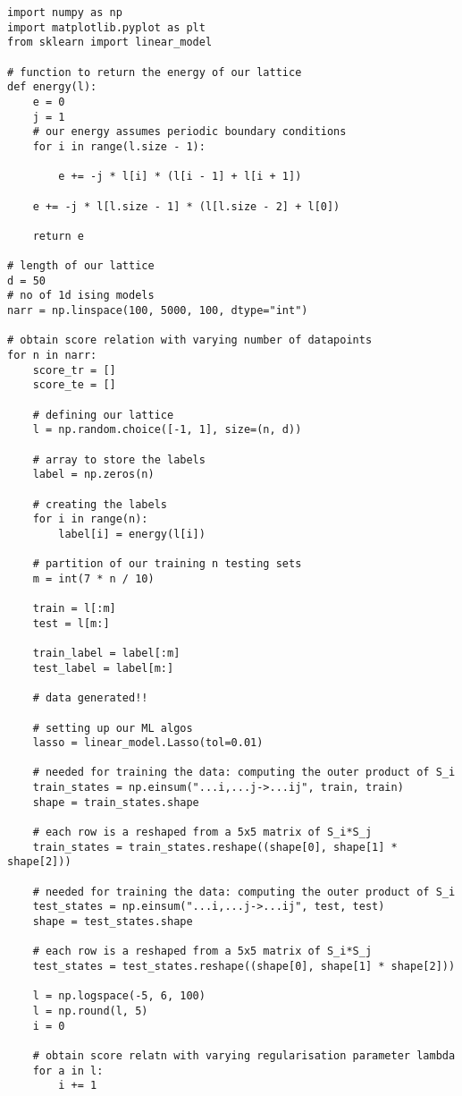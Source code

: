 \begin{verbatim}
import numpy as np
import matplotlib.pyplot as plt
from sklearn import linear_model

# function to return the energy of our lattice
def energy(l):
    e = 0
    j = 1
    # our energy assumes periodic boundary conditions
    for i in range(l.size - 1):

        e += -j * l[i] * (l[i - 1] + l[i + 1])

    e += -j * l[l.size - 1] * (l[l.size - 2] + l[0])

    return e

# length of our lattice
d = 50
# no of 1d ising models
narr = np.linspace(100, 5000, 100, dtype="int")

# obtain score relation with varying number of datapoints
for n in narr:
    score_tr = []
    score_te = []

    # defining our lattice
    l = np.random.choice([-1, 1], size=(n, d))

    # array to store the labels
    label = np.zeros(n)

    # creating the labels
    for i in range(n):
        label[i] = energy(l[i])

    # partition of our training n testing sets
    m = int(7 * n / 10)

    train = l[:m]
    test = l[m:]

    train_label = label[:m]
    test_label = label[m:]

    # data generated!!

    # setting up our ML algos
    lasso = linear_model.Lasso(tol=0.01)

    # needed for training the data: computing the outer product of S_i
    train_states = np.einsum("...i,...j->...ij", train, train)
    shape = train_states.shape

    # each row is a reshaped from a 5x5 matrix of S_i*S_j
    train_states = train_states.reshape((shape[0], shape[1] * shape[2]))

    # needed for training the data: computing the outer product of S_i
    test_states = np.einsum("...i,...j->...ij", test, test)
    shape = test_states.shape

    # each row is a reshaped from a 5x5 matrix of S_i*S_j
    test_states = test_states.reshape((shape[0], shape[1] * shape[2]))

    l = np.logspace(-5, 6, 100)
    l = np.round(l, 5)
    i = 0

    # obtain score relatn with varying regularisation parameter lambda
    for a in l:
        i += 1


\end{verbatim}
